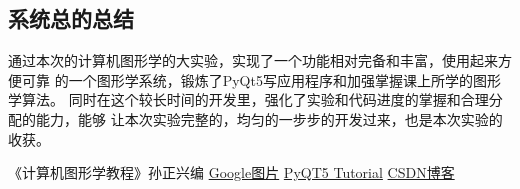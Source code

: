 \documentclass[a4paper,UTF8]{article}
\theoremstyle{definition}
\begin{document}
\subsection{系统总的总结}
通过本次的计算机图形学的大实验，实现了一个功能相对完备和丰富，使用起来方便可靠
的一个图形学系统，锻炼了PyQt5写应用程序和加强掌握课上所学的图形学算法。
同时在这个较长时间的开发里，强化了实验和代码进度的掌握和合理分配的能力，能够
让本次实验完整的，均匀的一步步的开发过来，也是本次实验的收获。




\begin{thebibliography}{99}  
    《计算机图形学教程》孙正兴编 
     \href{https://www.google.com/imghp?hl=zh-CN&ogbl}{Google图片}
     \href{https://build-system.fman.io/pyqt5-tutorial}{PyQT5 Tutorial}
     \href{https://blog.csdn.net/shenziheng1/article/details/54411098}{CSDN博客}
\end{thebibliography}
\end{document}
